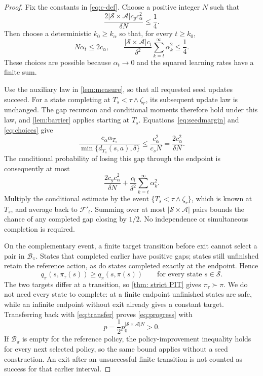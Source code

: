 \begin{proof}
Fix the constants in \eqref{eq:c-def}. Choose a positive integer $N$ such that
\[
\frac{2|\mathcal S\times\mathcal A|c_gc_\alpha^2}{\delta N}\le\frac14.
\]
Then choose a deterministic $k_0\ge k_\alpha$ so that, for every $t\ge k_0$,
\begin{equation}
\label{eq:choices}
N\alpha_t\le2c_\alpha,
\qquad
\frac{|\mathcal S\times\mathcal A|c_l}{\delta^2}\sum_{k=t}^\infty\alpha_k^2\le\frac14.
\end{equation}
These choices are possible because $\alpha_t\to0$ and the squared learning rates have a finite sum.

Use the auxiliary law in \autoref{lem:measure}, so that all requested seed updates succeed. For a state completing at $T_s<\tau\wedge\zeta_r$, its subsequent update law is unchanged. The gap recursion and conditional moments therefore hold under this law, and \autoref{lem:barrier} applies starting at $T_s$. Equations~\eqref{eq:seedmargin} and \eqref{eq:choices} give
\[
\frac{c_\alpha\alpha_{T_s}}{\min\{d_{T_s}(s,a),\delta\}}
\le\frac{c_\alpha^2}{c_sN}
=\frac{2c_\alpha^2}{\delta N}.
\]
The conditional probability of losing this gap through the endpoint is consequently at most
\begin{equation}
\label{eq:crossprob}
\frac{2c_gc_\alpha^2}{\delta N}
+\frac{c_l}{\delta^2}\sum_{k=t}^\infty\alpha_k^2.
\end{equation}
Multiply the conditional estimate by the event $\{T_s<\tau\wedge\zeta_r\}$, which is known at $T_s$, and average back to $\mathcal F'_t$. Summing over at most $|\mathcal S\times\mathcal A|$ pairs bounds the chance of any completed gap closing by $1/2$. No independence or simultaneous completion is required.

On the complementary event, a finite target transition before exit cannot select a pair in $\mathcal B_\pi$. States that completed earlier have positive gaps; states still unfinished retain the reference action, as do states completed exactly at the endpoint. Hence
\[
q_\pi(s,\pi_\tau(s))\ge q_\pi(s,\pi(s))
\qquad\text{for every state }s\in\mathcal S.
\]
The two targets differ at a transition, so \autoref{thm: strict PIT} gives $\pi_\tau\succ\pi$.
We do not need every state to complete: at a finite endpoint unfinished states are safe, while an infinite endpoint without exit already gives a constant target. Transferring back with \eqref{eq:transfer} proves \eqref{eq:progress} with
\[
p=\frac12p_0^{|\mathcal S\times\mathcal A|N}>0.
\]
If $\mathcal B_\pi$ is empty for the reference policy, the policy-improvement inequality holds for every next selected policy, so the same bound applies without a seed construction. An exit after an unsuccessful finite transition is not counted as success for that earlier interval.
\end{proof}

